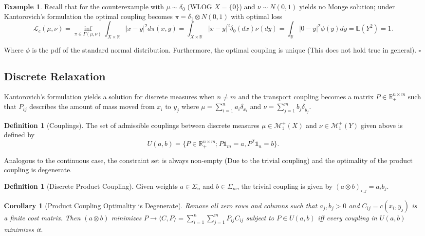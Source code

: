 \documentclass[12pt]{article}
\newtheorem{corollary}[theorem]{Corollary}
\theoremstyle{definition}
\newtheorem{definition}[theorem]{Definition}
\newtheorem*{example}{Example}
\theoremstyle{plain}
\begin{document}
\begin{spacing}{1}
{\begin{example}
    Recall that for the counterexample with $\mu \sim \delta_0$ (WLOG $X = \{0\}$) and $\nu \sim N(0, 1)$ yields no Monge solution; under Kantorovich's formulation the optimal coupling becomes $\pi = \delta_1 \otimes N(0, 1)$ with optimal loss
    \[
    \mathcal{L}_c(\mu, \nu) = \inf_{\pi \in \Gamma(\mu, \nu)} \displaystyle \int_{X \times \mathbb{R}} \lvert x - y \rvert^2 d\pi(x, y) = \int_{X \times \mathbb{R}} \lvert x - y \rvert^2 \delta_0(dx)\nu(dy) = \int_\mathbb{R} \lvert 0 - y \rvert^2 \phi(y)dy = \mathbb{E}(Y^2) = 1.
    \]

    Where $\phi$ is the pdf of the standard normal distribution. Furthermore, the optimal coupling is unique (This does not hold true in general). \hfill \(\square\)

\end{example}

\newpage

\subsection{Discrete Relaxation}
Kantorovich's formulation yields a solution for discrete measures when $n \neq m$ and the transport coupling becomes a matrix $P \in \mathbb{R}^{n \times m}_+$ such that $P_{ij}$ describes the amount of mass moved from $x_i$ to $y_j$ where $\mu = \sum_{i = 1}^n a_i \delta_{x_i}$ and $\nu = \sum_{j = 1}^m b_j \delta_{y_j}$.

\begin{definition}[Couplings]
    The set of admissible couplings between discrete measures $\mu \in \mathcal{M}_1^+(X)$ and $\nu \in \mathcal{M}_1^+(Y)$ given above is defined by
    \[
    U(a, b) = \{P \in \mathbb{R}^{n \times m}_+; P \mathds{1}_m = a, P^T \mathds{1}_n = b \}.
    \]
\end{definition}

Analogous to the continuous case, the constraint set is always non-empty (Due to the trivial coupling) and the optimality of the product coupling is degenerate.

\begin{definition}[Discrete Product Coupling]
    Given weights $a \in \Sigma_n$ and $b \in \Sigma_m$, the trivial coupling is given by $(a \otimes b)_{i, j} = a_i b_j$.
\end{definition}

\begin{corollary}[Product Coupling Optimality is Degenerate]
    Remove all zero rows and columns such that $a_j, b_j > 0$ and $C_{ij} = c(x_i, y_j)$ is a finite cost matrix. Then $(a \otimes b)$ minimizes $P \rightarrow \langle C, P \rangle = \sum_{i = 1}^n \sum_{j = 1}^m P_{ij}C_{ij}$ subject to $P \in U(a, b)$ iff every coupling in $U(a, b)$ minimizes it.
\end{corollary}

}
\end{spacing}
\end{document}
